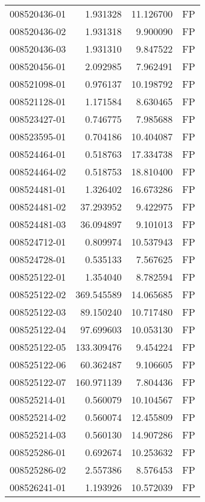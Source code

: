 \begin{tabular}{lrrl}
008520436-01 &    1.931328 &      11.126700 &   FP \\
008520436-02 &    1.931318 &       9.900090 &   FP \\
008520436-03 &    1.931310 &       9.847522 &   FP \\
008520456-01 &    2.092985 &       7.962491 &   FP \\
008521098-01 &    0.976137 &      10.198792 &   FP \\
008521128-01 &    1.171584 &       8.630465 &   FP \\
008523427-01 &    0.746775 &       7.985688 &   FP \\
008523595-01 &    0.704186 &      10.404087 &   FP \\
008524464-01 &    0.518763 &      17.334738 &   FP \\
008524464-02 &    0.518753 &      18.810400 &   FP \\
008524481-01 &    1.326402 &      16.673286 &   FP \\
008524481-02 &   37.293952 &       9.422975 &   FP \\
008524481-03 &   36.094897 &       9.101013 &   FP \\
008524712-01 &    0.809974 &      10.537943 &   FP \\
008524728-01 &    0.535133 &       7.567625 &   FP \\
008525122-01 &    1.354040 &       8.782594 &   FP \\
008525122-02 &  369.545589 &      14.065685 &   FP \\
008525122-03 &   89.150240 &      10.717480 &   FP \\
008525122-04 &   97.699603 &      10.053130 &   FP \\
008525122-05 &  133.309476 &       9.454224 &   FP \\
008525122-06 &   60.362487 &       9.106605 &   FP \\
008525122-07 &  160.971139 &       7.804436 &   FP \\
008525214-01 &    0.560079 &      10.104567 &   FP \\
008525214-02 &    0.560074 &      12.455809 &   FP \\
008525214-03 &    0.560130 &      14.907286 &   FP \\
008525286-01 &    0.692674 &      10.253632 &   FP \\
008525286-02 &    2.557386 &       8.576453 &   FP \\
008526241-01 &    1.193926 &      10.572039 &   FP \\

\end{tabular}
